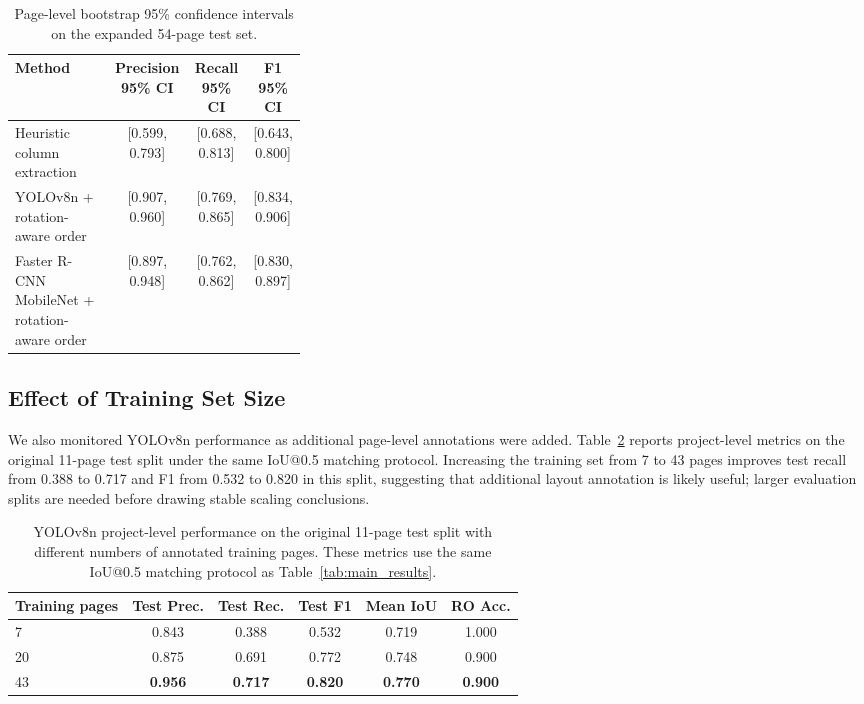 \documentclass[pdflatex,sn-mathphys-num]{sn-jnl}
\begin{document}
\begin{table}[t]
\centering
\scriptsize\setlength{\tabcolsep}{3pt}
\caption{Page-level bootstrap 95\% confidence intervals on the expanded 54-page test set.}
\label{tab:bootstrap_ci}
\begin{tabular}{p{0.34\linewidth}ccc}
\toprule
Method & Precision 95\% CI & Recall 95\% CI & F1 95\% CI \\
\midrule
Heuristic column extraction & [0.599, 0.793] & [0.688, 0.813] & [0.643, 0.800] \\
YOLOv8n + rotation-aware order & [0.907, 0.960] & [0.769, 0.865] & [0.834, 0.906] \\
Faster R-CNN MobileNet + rotation-aware order & [0.897, 0.948] & [0.762, 0.862] & [0.830, 0.897] \\
\bottomrule
\end{tabular}
\end{table}


\subsection{Effect of Training Set Size}
We also monitored YOLOv8n performance as additional page-level annotations were added. Table~\ref{tab:train_size} reports project-level metrics on the original 11-page test split under the same IoU@0.5 matching protocol. Increasing the training set from 7 to 43 pages improves test recall from 0.388 to 0.717 and F1 from 0.532 to 0.820 in this split, suggesting that additional layout annotation is likely useful; larger evaluation splits are needed before drawing stable scaling conclusions.

\begin{table}[t]
\centering
\scriptsize\setlength{\tabcolsep}{3pt}
\caption{YOLOv8n project-level performance on the original 11-page test split with different numbers of annotated training pages. These metrics use the same IoU@0.5 matching protocol as Table~\ref{tab:main_results}.}
\label{tab:train_size}
\begin{tabular}{lccccc}
\toprule
Training pages & Test Prec. & Test Rec. & Test F1 & Mean IoU & RO Acc. \\
\midrule
7 & 0.843 & 0.388 & 0.532 & 0.719 & 1.000 \\
20 & 0.875 & 0.691 & 0.772 & 0.748 & 0.900 \\
43 & \textbf{0.956} & \textbf{0.717} & \textbf{0.820} & \textbf{0.770} & \textbf{0.900} \\
\bottomrule
\end{tabular}
\end{table}
\end{document}
